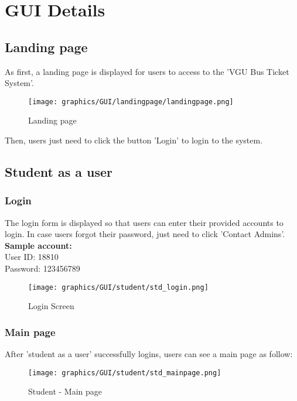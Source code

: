 \section{GUI Details}

\subsection{Landing page}
\noindent As first, a landing page is displayed for users to access to the 'VGU Bus Ticket System'.\\
    \begin{figure}[H]
        \centering
        \texttt{[image: graphics/GUI/landingpage/landingpage.png]}
        \caption{Landing page}
    \label{fig:landingpage}
    \end{figure}
\noindent Then, users just need to click the button 'Login' to login to the system. \\
    
    
\subsection{Student as a user}
    \subsubsection{Login}
\noindent The login form is displayed so that users can enter their provided accounts to login. In case users forgot their password, just need to click 'Contact Admins'.
\\ \textbf{Sample account:} 
\\ User ID: 18810
\\ Password: 123456789
        \begin{figure}[H]
            \centering
            \texttt{[image: graphics/GUI/student/std\_login.png]}
            \caption{Login Screen}
        \label{fig:loginscreen}
        \end{figure}
        
        \subsubsection{Main page}
            \noindent After 'student as a user' successfully logins, users can see a main page as follow:\\
                \begin{figure}[H]
                    \centering
                    \texttt{[image: graphics/GUI/student/std\_mainpage.png]}
                    \caption{Student - Main page}
                \label{fig:std_mainpage}
                \end{figure}
    
